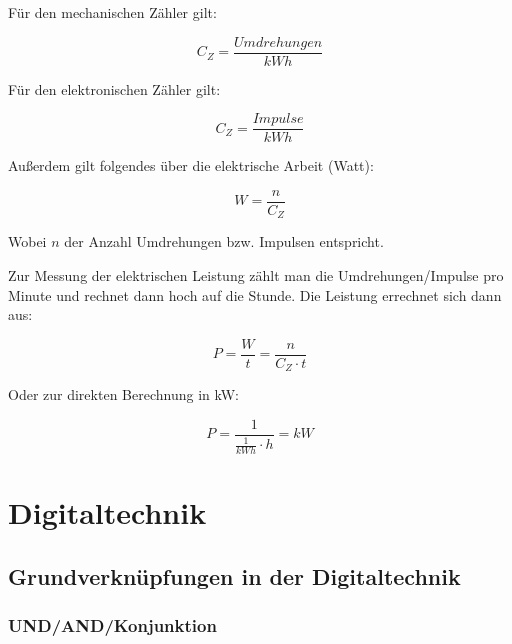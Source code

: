 \documentclass[a4paper, 12pt]{report}
\begin{document}
Für den mechanischen Zähler gilt: 

\begin{center}
    \begin{equation}
        C_Z = \frac{Umdrehungen}{kWh}
    \end{equation}
\end{center}

Für den elektronischen Zähler gilt: 
\begin{center}
    \begin{equation}
        C_Z = \frac{Impulse}{kWh}
    \end{equation}
\end{center}

\newpage
Außerdem gilt folgendes über die elektrische Arbeit (Watt):
\begin{center}
    \begin{equation}
        W = \frac{n}{C_Z}
    \end{equation}
\end{center}

Wobei $n$ der Anzahl Umdrehungen bzw. Impulsen entspricht. 

Zur Messung der elektrischen Leistung zählt man die Umdrehungen/Impulse pro 
Minute und rechnet dann hoch auf die Stunde. Die Leistung errechnet sich dann
aus: 

\begin{center}
    \begin{equation}
        P = \frac{W}{t} = \frac{n}{C_Z \cdot t}
    \end{equation}
\end{center}

Oder zur direkten Berechnung in kW:

\begin{center}
    \begin{equation}
        P = \frac{1}{\frac{1}{kWh} \cdot h} = kW
    \end{equation}
\end{center}

\section{Digitaltechnik}

\subsection{Grundverknüpfungen in der Digitaltechnik}

\subsubsection{UND/AND/Konjunktion}
\end{document}
